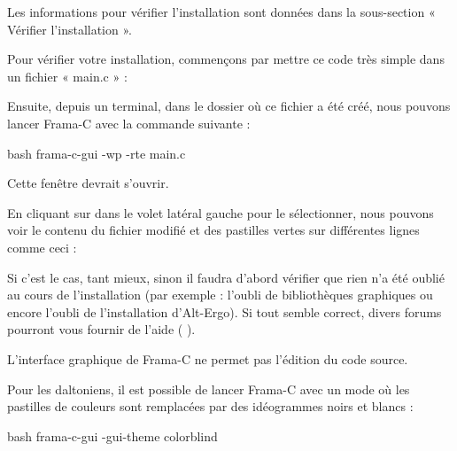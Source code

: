 Les informations pour vérifier l'installation sont données dans la sous-section « Vérifier l'installation ».




Pour vérifier votre installation, commençons par mettre ce code très simple dans un
fichier « main.c » :




Ensuite, depuis un terminal, dans le dossier où ce fichier a été créé,
nous pouvons lancer Frama-C avec la commande suivante :



\begin{CodeBlock}{bash}
frama-c-gui -wp -rte main.c
\end{CodeBlock}



Cette fenêtre devrait s'ouvrir.





En cliquant sur  dans le volet latéral gauche pour le sélectionner,
nous pouvons voir le contenu du fichier  modifié et des pastilles
vertes sur différentes lignes comme ceci :





Si c'est le cas, tant mieux, sinon il faudra d'abord vérifier que rien n'a été
oublié au cours de l'installation (par exemple : l'oubli de bibliothèques graphiques
ou encore l'oubli de l'installation d'Alt-Ergo). Si tout semble correct, divers forums
pourront vous fournir de l'aide
(
 ).



\begin{Warning}
L'interface graphique de Frama-C ne permet pas l'édition du code source.
\end{Warning}


\begin{Information}
Pour les daltoniens, il est possible de lancer Frama-C avec un mode où les
pastilles de couleurs sont remplacées par des idéogrammes noirs et blancs :

\begin{CodeBlock}{bash}
frama-c-gui -gui-theme colorblind
\end{CodeBlock}
\end{Information}


